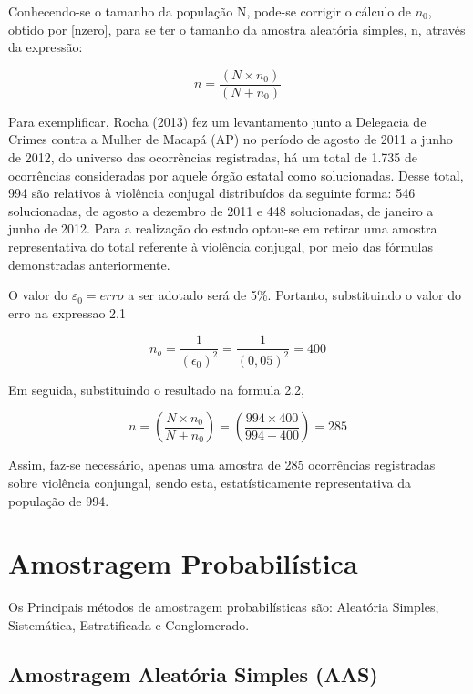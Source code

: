 \newpage
Conhecendo-se o tamanho da população N, pode-se corrigir o cálculo de $n_{0}$, obtido por \ref{nzero}, para se ter o tamanho da amostra aleatória simples, n, através da expressão:


\begin{equation}\label{nzero2}
    n=\frac{\left(N \times n_{0}\right)}{\left(N + n_{0}\right)}
\end{equation}


Para exemplificar, Rocha (2013) fez um levantamento junto a
Delegacia de Crimes contra a Mulher de Macapá (AP) no  período de
agosto de 2011 a junho de 2012, do universo das ocorrências
registradas, há um total de 1.735 de ocorrências consideradas por
aquele órgão estatal como solucionadas. Desse total, 994 são
relativos à violência conjugal distribuídos da seguinte forma: 546
solucionadas, de agosto a dezembro de 2011 e 448 solucionadas, de
janeiro a junho de 2012. Para a realização do estudo optou-se em
retirar uma amostra representativa do total referente à violência
conjugal, por meio das fórmulas demonstradas anteriormente.

\vskip0.3cm


O valor do $\varepsilon_{0}=erro$ a ser adotado será de 5\%.
Portanto, substituindo o valor do erro na expressao 2.1

\begin{equation}\label{nzero}
    n_{o}=\frac{1}{\left(\epsilon_{0}\right)^2}=\frac{1}{\left(0,05
    \right)^2}=400
\end{equation}

Em seguida, substituindo o resultado na formula 2.2,

\begin{equation}\label{nzero2}
    n=\left(\frac{N \times n_{0}}{N + n_{0}}\right)=
    \left(\frac{994 \times 400}{994 + 400}\right)=285
\end{equation}

Assim, faz-se necessário, apenas uma amostra de 285 ocorrências
registradas sobre violência conjungal, sendo esta,
estatísticamente representativa da população de 994.



\newpage
\section{Amostragem Probabilística}
\inic  Os Principais métodos de amostragem probabilísticas são: Aleatória Simples, Sistemática, Estratificada e Conglomerado.

\subsection{Amostragem Aleatória Simples (AAS)}

